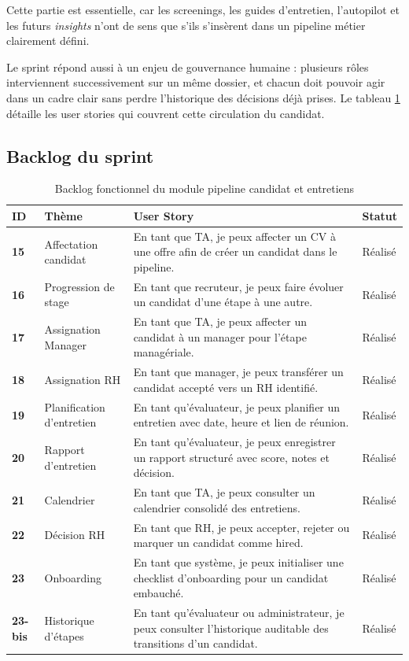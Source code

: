 Cette partie est essentielle, car les screenings, les guides d'entretien, l'autopilot et les futurs \textit{insights} n'ont de sens que s'ils s'insèrent dans un pipeline métier clairement défini.

Le sprint répond aussi à un enjeu de gouvernance humaine : plusieurs rôles interviennent successivement sur un même dossier, et chacun doit pouvoir agir dans un cadre clair sans perdre l'historique des décisions déjà prises.
Le tableau \ref{tab:pipeline-backlog} détaille les user stories qui couvrent cette circulation du candidat.

\subsection{Backlog du sprint}
\begin{table}[H]
  \centering
  \caption{\label{tab:pipeline-backlog}Backlog fonctionnel du module pipeline candidat et entretiens}
  \begin{tabularx}{\textwidth}{>{\bfseries}p{1.3cm}p{3cm}X>{\raggedright\arraybackslash}p{2cm}}
    \toprule
    ID & Thème & User Story & Statut \\
    \midrule
    15 & Affectation candidat & En tant que TA, je peux affecter un CV à une offre afin de créer un candidat dans le pipeline. & Réalisé \\
    16 & Progression de stage & En tant que recruteur, je peux faire évoluer un candidat d'une étape à une autre. & Réalisé \\
    17 & Assignation Manager & En tant que TA, je peux affecter un candidat à un manager pour l'étape managériale. & Réalisé \\
    18 & Assignation RH & En tant que manager, je peux transférer un candidat accepté vers un RH identifié. & Réalisé \\
    19 & Planification d'entretien & En tant qu'évaluateur, je peux planifier un entretien avec date, heure et lien de réunion. & Réalisé \\
    20 & Rapport d'entretien & En tant qu'évaluateur, je peux enregistrer un rapport structuré avec score, notes et décision. & Réalisé \\
    21 & Calendrier & En tant que TA, je peux consulter un calendrier consolidé des entretiens. & Réalisé \\
    22 & Décision RH & En tant que RH, je peux accepter, rejeter ou marquer un candidat comme hired. & Réalisé \\
    23 & Onboarding & En tant que système, je peux initialiser une checklist d'onboarding pour un candidat embauché. & Réalisé \\
    23-bis & Historique d'étapes & En tant qu'évaluateur ou administrateur, je peux consulter l'historique auditable des transitions d'un candidat. & Réalisé \\
    \bottomrule
  \end{tabularx}
\end{table}

